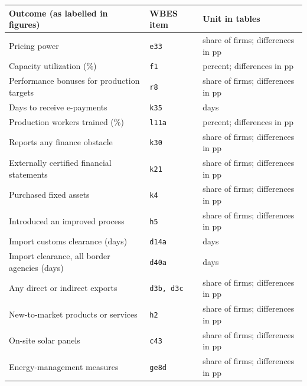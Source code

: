\begin{tabular}{@{}l l l@{}}
\toprule
Outcome (as labelled in figures) & WBES item & Unit in tables \\
\midrule
Pricing power & \texttt{e33} & share of firms; differences in pp \\
Capacity utilization (\%) & \texttt{f1} & percent; differences in pp \\
Performance bonuses for production targets & \texttt{r8} & share of firms; differences in pp \\
Days to receive e-payments & \texttt{k35} & days \\
Production workers trained (\%) & \texttt{l11a} & percent; differences in pp \\
Reports any finance obstacle & \texttt{k30} & share of firms; differences in pp \\
Externally certified financial statements & \texttt{k21} & share of firms; differences in pp \\
Purchased fixed assets & \texttt{k4} & share of firms; differences in pp \\
Introduced an improved process & \texttt{h5} & share of firms; differences in pp \\
Import customs clearance (days) & \texttt{d14a} & days \\
Import clearance, all border agencies (days) & \texttt{d40a} & days \\
Any direct or indirect exports & \texttt{d3b, d3c} & share of firms; differences in pp \\
New-to-market products or services & \texttt{h2} & share of firms; differences in pp \\
On-site solar panels & \texttt{c43} & share of firms; differences in pp \\
Energy-management measures & \texttt{ge8d} & share of firms; differences in pp \\
\bottomrule
\end{tabular}
